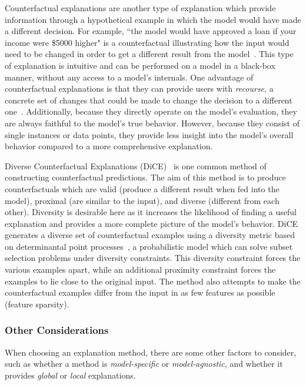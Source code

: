 \documentclass[graybox]{svmult}
\begin{document}
Counterfactual explanations are another type of explanation 
which provide information through a hypothetical example 
in which the model would have made a different decision. 
For example, ``the model would have approved a loan if your income were \$5000 higher" 
is a counterfactual illustrating how the input would need to be changed 
in order to get a different result from the model~\cite{wachterCounterfactualExplanationsOpening2017b}. 
This type of explanation is intuitive and can be performed on a model in a black-box manner, 
without any access to a model's internals. 
One advantage of counterfactual explanations is that 
they can provide users with \textit{recourse}, 
a concrete set of changes that could be made to change the decision to 
a different one~\cite{karimiSurveyAlgorithmicRecourse2020}. 
Additionally, because they directly operate on the model's evaluation, 
they are always faithful to the model's true behavior. 
However, because they consist of single instances or data points, 
they provide less insight into the model's overall behavior 
compared to a more comprehensive explanation.

Diverse Counterfactual Explanations (DiCE)~\cite{mothilalExplainingMachineLearning2020} 
is one common method of constructing counterfactual predictions. 
The aim of this method is to produce counterfactuals 
which are valid (produce a different result when fed into the model), 
proximal (are similar to the input), 
and diverse (different from each other). 
Diversity is desirable here as it increases the likelihood of 
finding a useful explanation and provides a more complete picture of the model's behavior. 
DiCE generates a diverse set of counterfactual examples using a diversity metric 
based on determinantal point processes~\cite{kuleszaDeterminantalPointProcesses2012}, 
a probabilistic model which can solve subset selection problems under diversity constraints. 
This diversity constraint forces the various examples apart, 
while an additional proximity constraint forces the examples to lie close to the original input. 
The method also attempts to make the counterfactual examples differ from the input 
in as few features as possible (feature sparsity).

\subsubsection{Other Considerations}

When choosing an explanation method, there are some other factors to consider, 
such as whether a method is {\it model-specific} or {\it model-agnostic}, 
and whether it provides {\it global} or {\it local} explanations.
\end{document}

